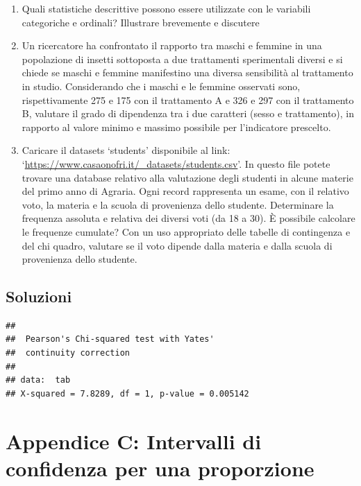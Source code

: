 \documentclass[
  12pt,
]{book}
\providecommand{\tightlist}{%
  \setlength{\itemsep}{0pt}\setlength{\parskip}{0pt}}
\begin{document}
\begin{enumerate}
\def\labelenumi{\arabic{enumi}.}
\tightlist
\item
  Quali statistiche descrittive possono essere utilizzate con le variabili categoriche e ordinali? Illustrare brevemente e discutere
\item
  Un ricercatore ha confrontato il rapporto tra maschi e femmine in una popolazione di insetti sottoposta a due trattamenti sperimentali diversi e si chiede se maschi e femmine manifestino una diversa sensibilità al trattamento in studio. Considerando che i maschi e le femmine osservati sono, rispettivamente 275 e 175 con il trattamento A e 326 e 297 con il trattamento B, valutare il grado di dipendenza tra i due caratteri (sesso e trattamento), in rapporto al valore minimo e massimo possibile per l'indicatore prescelto.
\item
  Caricare il datasets `students' disponibile al link: `\url{https://www.casaonofri.it/_datasets/students.csv}'. In questo file potete trovare una database relativo alla valutazione degli studenti in alcune materie del primo anno di Agraria. Ogni record rappresenta un esame, con il relativo voto, la materia e la scuola di provenienza dello studente.
  Determinare la frequenza assoluta e relativa dei diversi voti (da 18 a 30). È possibile calcolare le frequenze cumulate? Con un uso appropriato delle tabelle di contingenza e del chi quadro, valutare se il voto dipende dalla materia e dalla scuola di provenienza dello studente.
\end{enumerate}

\hypertarget{soluzioni-1}{%
\section{Soluzioni}\label{soluzioni-1}}

\begin{verbatim}
## 
##  Pearson's Chi-squared test with Yates'
##  continuity correction
## 
## data:  tab
## X-squared = 7.8289, df = 1, p-value = 0.005142
\end{verbatim}

\hypertarget{appendice-c-intervalli-di-confidenza-per-una-proporzione}{%
\chapter{Appendice C: Intervalli di confidenza per una proporzione}\label{appendice-c-intervalli-di-confidenza-per-una-proporzione}}
\end{document}
